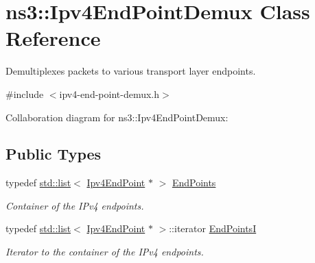 \hypertarget{classns3_1_1Ipv4EndPointDemux}{}\section{ns3\+:\+:Ipv4\+End\+Point\+Demux Class Reference}
\label{classns3_1_1Ipv4EndPointDemux}


Demultiplexes packets to various transport layer endpoints.  




{\ttfamily \#include $<$ipv4-\/end-\/point-\/demux.\+h$>$}



Collaboration diagram for ns3\+:\+:Ipv4\+End\+Point\+Demux\+:
\subsection*{Public Types}
\begin{DoxyCompactItemize}
\item 
typedef \hyperlink{openflow-interface_8h_afd9bcfa176617760671b67580f536fa7}{std\+::list}$<$ \hyperlink{classns3_1_1Ipv4EndPoint}{Ipv4\+End\+Point} $\ast$ $>$ \hyperlink{classns3_1_1Ipv4EndPointDemux_a506a9661c08e2a64dab09ad6613d3b45}{End\+Points}
\begin{DoxyCompactList}\small\item\em Container of the I\+Pv4 endpoints. \end{DoxyCompactList}\item 
typedef \hyperlink{openflow-interface_8h_afd9bcfa176617760671b67580f536fa7}{std\+::list}$<$ \hyperlink{classns3_1_1Ipv4EndPoint}{Ipv4\+End\+Point} $\ast$ $>$\+::iterator \hyperlink{classns3_1_1Ipv4EndPointDemux_ad3ce6fd3c128dcb46d10d562c82b4e07}{End\+PointsI}
\begin{DoxyCompactList}\small\item\em Iterator to the container of the I\+Pv4 endpoints. \end{DoxyCompactList}\end{DoxyCompactItemize}

